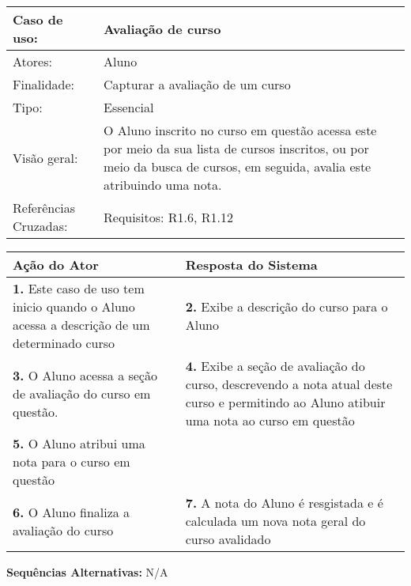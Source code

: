 \documentclass[12pt,a4paper,onecolumn,titlepage]{article}
\begin{document}
\begin{table}[h!]
\begin{center}
\begin{tabular}{p{2.5cm} p{9.5cm}}
Caso de uso: & \textbf{Avaliação de curso} \\ \hline
Atores: & Aluno \\ \hline
Finalidade: & Capturar a avaliação de um curso\\ \hline
Tipo: & Essencial \\ \hline
Visão geral: & O Aluno inscrito no curso em questão acessa este por meio da sua lista de cursos inscritos, ou por meio da busca de cursos, em seguida, avalia este atribuindo uma nota. \\ \hline
Referências Cruzadas: & Requisitos: R1.6, R1.12\\

\end{tabular}
\end{center}
\end{table} 

\begin{center}
\def\arraystretch{1.1}
\begin{tabular}{|p{6cm}|p{6cm}|}

\hline
\textbf{Ação do Ator} & \textbf{Resposta do Sistema} \\ \hline
\textbf{1.} Este caso de uso tem inicio quando o Aluno acessa a descrição de um determinado curso  & \textbf{2.} Exibe a descrição do curso para o Aluno  \\ \hline
\textbf{3.} O Aluno acessa a seção de avaliação do curso em questão.  & \textbf{4.} Exibe a seção de avaliação do curso, descrevendo a nota atual deste curso e permitindo ao Aluno atibuir uma nota ao curso em questão  \\ \hline
\textbf{5.} O Aluno atribui uma nota para o curso em questão  &   \\ \hline
\textbf{6.} O Aluno finaliza a avaliação do curso  & \textbf{7.} A nota do Aluno é resgistada e é calculada um nova nota geral do curso avalidado \\ \hline
\end{tabular}
\end{center}

\textbf{Sequências Alternativas:} N/A


\newpage
\end{document}
